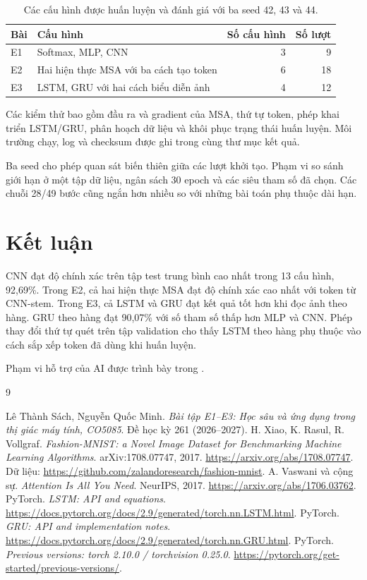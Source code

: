 \documentclass[12pt,a4paper]{report}
\begin{document}
\begin{table}[htbp]\centering
\begin{tabularx}{\textwidth}{@{}lXrr@{}}\toprule
Bài & Cấu hình & Số cấu hình & Số lượt\\\midrule
E1 & Softmax, MLP, CNN & 3 & 9\\
E2 & Hai hiện thực MSA với ba cách tạo token & 6 & 18\\
E3 & LSTM, GRU với hai cách biểu diễn ảnh & 4 & 12\\\bottomrule
\end{tabularx}
\caption{Các cấu hình được huấn luyện và đánh giá với ba seed 42, 43 và 44.}
\end{table}

Các kiểm thử bao gồm đầu ra và gradient của MSA, thứ tự token, phép khai triển LSTM/GRU, phân hoạch dữ liệu và khôi phục trạng thái huấn luyện. Môi trường chạy, log và checksum được ghi trong  cùng thư mục kết quả.

Ba seed cho phép quan sát biến thiên giữa các lượt khởi tạo. Phạm vi so sánh giới hạn ở một tập dữ liệu, ngân sách 30 epoch và các siêu tham số đã chọn. Các chuỗi 28/49 bước cũng ngắn hơn nhiều so với những bài toán phụ thuộc dài hạn.

\section{Kết luận}
CNN đạt độ chính xác trên tập test trung bình cao nhất trong 13 cấu hình, 92,69\%. Trong E2, cả hai hiện thực MSA đạt độ chính xác cao nhất với token từ CNN-stem. Trong E3, cả LSTM và GRU đạt kết quả tốt hơn khi đọc ảnh theo hàng. GRU theo hàng đạt 90,07\% với số tham số thấp hơn MLP và CNN. Phép thay đổi thứ tự quét trên tập validation cho thấy LSTM theo hàng phụ thuộc vào cách sắp xếp token đã dùng khi huấn luyện.

Phạm vi hỗ trợ của AI được trình bày trong \href{https://github.com/dathuynh1108/CO5085-deep-learning/blob/main/AI\_USE\_REPORT.md}{}.

\begin{thebibliography}{9}
 Lê Thành Sách, Nguyễn Quốc Minh. \emph{Bài tập E1–E3: Học sâu và ứng dụng trong thị giác máy tính, CO5085}. Đề học kỳ 261 (2026–2027).
 H. Xiao, K. Rasul, R. Vollgraf. \emph{Fashion-MNIST: a Novel Image Dataset for Benchmarking Machine Learning Algorithms}. arXiv:1708.07747, 2017. \url{https://arxiv.org/abs/1708.07747}. Dữ liệu: \url{https://github.com/zalandoresearch/fashion-mnist}.
 A. Vaswani và cộng sự. \emph{Attention Is All You Need}. NeurIPS, 2017. \url{https://arxiv.org/abs/1706.03762}.
 PyTorch. \emph{LSTM: API and equations}. \url{https://docs.pytorch.org/docs/2.9/generated/torch.nn.LSTM.html}.
 PyTorch. \emph{GRU: API and implementation notes}. \url{https://docs.pytorch.org/docs/2.9/generated/torch.nn.GRU.html}.
 PyTorch. \emph{Previous versions: torch 2.10.0 / torchvision 0.25.0}. \url{https://pytorch.org/get-started/previous-versions/}.
\end{thebibliography}
\end{document}
